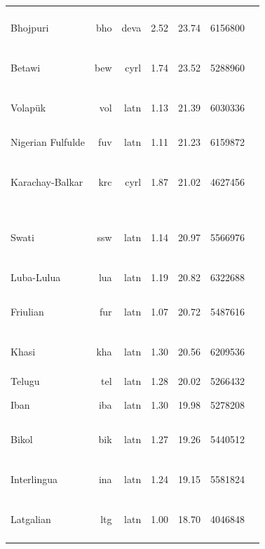 \documentclass[11pt]{article}
\begin{document}
\begin{center}
\begin{longtable}[width=0.9\textwidth]{|lrrrrrl|}
Bhojpuri & bho & deva & 2.52 & 23.74 & 6156800 & {\color{nllb}\rule{1.84cm}{8pt}}{\color{madlad400}\rule{1.56cm}{8pt}}{\color{other}\rule{0.5999999999999996cm}{8pt}} \\ 
Betawi & bew & cyrl & 1.74 & 23.52 & 5288960 & {\color{glot500}\rule{1.91cm}{8pt}}{\color{other}\rule{2.09cm}{8pt}} \\ 
Volapük & vol & latn & 1.13 & 21.39 & 6030336 & {\color{oscar}\rule{0.18cm}{8pt}}{\color{glot500}\rule{2.89cm}{8pt}}{\color{other}\rule{0.9299999999999997cm}{8pt}} \\ 
Nigerian Fulfulde & fuv & latn & 1.11 & 21.23 & 6159872 & {\color{nllb}\rule{4.0cm}{8pt}} \\ 
Karachay-Balkar & krc & cyrl & 1.87 & 21.02 & 4627456 & {\color{oscar}\rule{0.14cm}{8pt}}{\color{madlad400}\rule{2.34cm}{8pt}}{\color{glot500}\rule{0.46cm}{8pt}}{\color{other}\rule{1.06cm}{8pt}} \\ 
Swati & ssw & latn & 1.14 & 20.97 & 5566976 & {\color{nllb}\rule{2.53cm}{8pt}}{\color{madlad400}\rule{0.58cm}{8pt}}{\color{glot500}\rule{0.8cm}{8pt}}{\color{other}\rule{0.08999999999999986cm}{8pt}} \\ 
Luba-Lulua & lua & latn & 1.19 & 20.82 & 6322688 & {\color{nllb}\rule{4.0cm}{8pt}}{\color{glot500}\rule{0.0cm}{8pt}} \\ 
Friulian & fur & latn & 1.07 & 20.72 & 5487616 & {\color{nllb}\rule{2.9cm}{8pt}}{\color{glot500}\rule{0.63cm}{8pt}}{\color{other}\rule{0.4700000000000002cm}{8pt}} \\ 
Khasi & kha & latn & 1.30 & 20.56 & 6209536 & {\color{madlad400}\rule{3.99cm}{8pt}}{\color{other}\rule{0.009999999999999787cm}{8pt}} \\ 
Telugu & tel & latn & 1.28 & 20.02 & 5266432 & {\color{madlad400}\rule{4.0cm}{8pt}} \\ 
Iban & iba & latn & 1.30 & 19.98 & 5278208 & {\color{madlad400}\rule{4.0cm}{8pt}}{\color{glot500}\rule{0.0cm}{8pt}}{\color{other}\rule{0.0cm}{8pt}} \\ 
Bikol & bik & latn & 1.27 & 19.26 & 5440512 & {\color{madlad400}\rule{1.19cm}{8pt}}{\color{glot500}\rule{1.73cm}{8pt}}{\color{other}\rule{1.08cm}{8pt}} \\ 
Interlingua & ina & latn & 1.24 & 19.15 & 5581824 & {\color{glot500}\rule{3.0cm}{8pt}}{\color{other}\rule{1.0cm}{8pt}} \\ 
Latgalian & ltg & latn & 1.00 & 18.70 & 4046848 & {\color{nllb}\rule{1.28cm}{8pt}}{\color{madlad400}\rule{2.6cm}{8pt}}{\color{other}\rule{0.1200000000000001cm}{8pt}} \\ 

\end{longtable}
\end{center}
\end{document}
